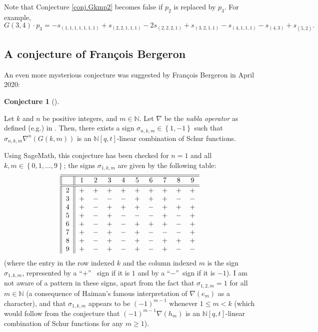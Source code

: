 \documentclass[numbers=enddot,12pt,final,onecolumn,notitlepage]{scrartcl}%
\theoremstyle{definition}
\newtheorem{conj}[theo]{Conjecture}
\newenvironment{conjecture}[1][]
{\begin{conj}[#1]\begin{leftbar}}
{\end{leftbar}\end{conj}}
\begin{document}
Note that Conjecture \ref{conj.Gkmp2} becomes false if $p_{2}$ is replaced by
$p_{3}$. For example,%
\[
G\left(  3,4\right)  \cdot p_{3}=-s_{\left(  1,1,1,1,1,1,1\right)
}+s_{\left(  2,2,1,1,1\right)  }-2s_{\left(  2,2,2,1\right)  }+s_{\left(
3,2,1,1\right)  }-s_{\left(  4,1,1,1\right)  }-s_{\left(  4,3\right)
}+s_{\left(  5,2\right)  }.
\]


\subsection{A conjecture of Fran\c{c}ois Bergeron}

An even more mysterious conjecture was suggested by Fran\c{c}ois Bergeron in
April 2020:

\begin{conjecture}
\label{conj.nabla-fb}Let $k$ and $n$ be positive integers, and $m\in
\mathbb{N}$. Let $\nabla$ be the \emph{nabla operator} as defined (e.g.) in
\cite[\S 3.2.1]{Berger19}. Then, there exists a sign $\sigma_{n,k,m}%
\in\left\{  1,-1\right\}  $ such that $\sigma_{n,k,m}\nabla^{n}\left(
G\left(  k,m\right)  \right)  $ is an $\mathbb{N}\left[  q,t\right]  $-linear
combination of Schur functions.
\end{conjecture}

Using SageMath, this conjecture has been checked for $n=1$ and all
$k,m\in\left\{  0,1,\ldots,9\right\}  $; the signs $\sigma_{1,k,m}$ are given
by the following table:%
\[%
\begin{tabular}
[c]{||c||ccccccccc}\hline\hline
& $1$ & $2$ & $3$ & $4$ & $5$ & $6$ & $7$ & $8$ & $9$\\\hline\hline
$2$ & $+$ & $+$ & $+$ & $+$ & $+$ & $+$ & $+$ & $+$ & $+$\\
$3$ & $+$ & $-$ & $-$ & $-$ & $+$ & $+$ & $+$ & $-$ & $-$\\
$4$ & $+$ & $-$ & $+$ & $+$ & $+$ & $-$ & $+$ & $+$ & $+$\\
$5$ & $+$ & $-$ & $+$ & $-$ & $-$ & $-$ & $+$ & $-$ & $+$\\
$6$ & $+$ & $-$ & $+$ & $-$ & $+$ & $+$ & $+$ & $-$ & $+$\\
$7$ & $+$ & $-$ & $+$ & $-$ & $+$ & $-$ & $-$ & $-$ & $+$\\
$8$ & $+$ & $-$ & $+$ & $-$ & $+$ & $-$ & $+$ & $+$ & $+$\\
$9$ & $+$ & $-$ & $+$ & $-$ & $+$ & $-$ & $+$ & $-$ & $-$%
\end{tabular}
\]
(where the entry in the row indexed $k$ and the column indexed $m$ is the sign
$\sigma_{1,k,m}$, represented by a \textquotedblleft$+$\textquotedblright%
\ sign if it is $1$ and by a \textquotedblleft$-$\textquotedblright\ sign if
it is $-1$). I am not aware of a pattern in these signs, apart from the fact
that $\sigma_{1,2,m}=1$ for all $m\in\mathbb{N}$ (a consequence of Haiman's
famous interpretation of $\nabla\left(  e_{m}\right)  $ as a character), and
that $\sigma_{1,k,m}$ appears to be $\left(  -1\right)  ^{m-1}$ whenever
$1\leq m<k$ (which would follow from the conjecture that $\left(  -1\right)
^{m-1}\nabla\left(  h_{m}\right)  $ is an $\mathbb{N}\left[  q,t\right]
$-linear combination of Schur functions for any $m\geq1$).
\end{document}
